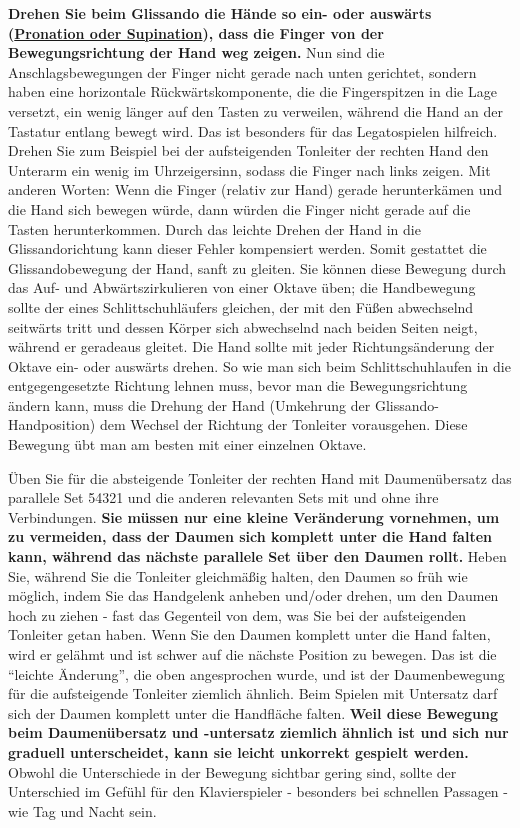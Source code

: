 \textbf{Drehen Sie beim Glissando die Hände so ein- oder auswärts (\hyperref[c1iii4ProSup]{Pronation oder Supination}), dass die Finger von der Bewegungsrichtung der Hand weg zeigen.}
Nun sind die Anschlagsbewegungen der Finger nicht gerade nach unten gerichtet, sondern haben eine horizontale Rückwärtskomponente, die die Fingerspitzen in die Lage versetzt, ein wenig länger auf den Tasten zu verweilen, während die Hand an der Tastatur entlang bewegt wird.
Das ist besonders für das Legatospielen hilfreich.
Drehen Sie zum Beispiel bei der aufsteigenden Tonleiter der rechten Hand den Unterarm ein wenig im Uhrzeigersinn, sodass die Finger nach links zeigen.
Mit anderen Worten: Wenn die Finger (relativ zur Hand) gerade herunterkämen und die Hand sich bewegen würde, dann würden die Finger nicht gerade auf die Tasten herunterkommen.
Durch das leichte Drehen der Hand in die Glissandorichtung kann dieser Fehler kompensiert werden.
Somit gestattet die Glissandobewegung der Hand, sanft zu gleiten.
Sie können diese Bewegung durch das Auf- und Abwärtszirkulieren von einer Oktave üben; die Handbewegung sollte der eines Schlittschuhläufers gleichen, der mit den Füßen abwechselnd seitwärts tritt und dessen Körper sich abwechselnd nach beiden Seiten neigt, während er geradeaus gleitet.
Die Hand sollte mit jeder Richtungsänderung der Oktave ein- oder auswärts drehen.
So wie man sich beim Schlittschuhlaufen in die entgegengesetzte Richtung lehnen muss, bevor man die Bewegungsrichtung ändern kann, muss die Drehung der Hand (Umkehrung der Glissando-Handposition) dem Wechsel der Richtung der Tonleiter vorausgehen.
Diese Bewegung übt man am besten mit einer einzelnen Oktave.

Üben Sie für die absteigende Tonleiter der rechten Hand mit Daumenübersatz das parallele Set 54321 und die anderen relevanten Sets mit und ohne ihre Verbindungen.
\textbf{Sie müssen nur eine kleine Veränderung vornehmen, um zu vermeiden, dass der Daumen sich komplett unter die Hand falten kann, während das nächste parallele Set über den Daumen rollt.}
Heben Sie, während Sie die Tonleiter gleichmäßig halten, den Daumen so früh wie möglich, indem Sie das Handgelenk anheben und/oder drehen, um den Daumen hoch zu ziehen - fast das Gegenteil von dem, was Sie bei der aufsteigenden Tonleiter getan haben.
Wenn Sie den Daumen komplett unter die Hand falten, wird er gelähmt und ist schwer auf die nächste Position zu bewegen.
Das ist die \enquote{leichte Änderung}, die oben angesprochen wurde, und ist der Daumenbewegung für die aufsteigende Tonleiter ziemlich ähnlich.
Beim Spielen mit Untersatz darf sich der Daumen komplett unter die Handfläche falten.
\textbf{Weil diese Bewegung beim Daumenübersatz und -untersatz ziemlich ähnlich ist und sich nur graduell unterscheidet, kann sie leicht unkorrekt gespielt werden.}
Obwohl die Unterschiede in der Bewegung sichtbar gering sind, sollte der Unterschied im Gefühl für den Klavierspieler - besonders bei schnellen Passagen - wie Tag und Nacht sein.

